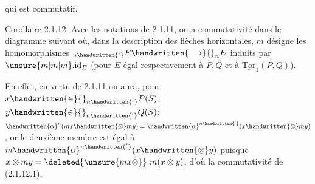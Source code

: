 \margin{\handwritten{$\unsure{=|--}$}}
 qui  est  commutatif.
\margin{\handwritten{$\big|$}}

\uline{Corollaire} 2.1.12. Avec les notations de 2.1.11, on a commutativité dans le diagramme suivant
\margin{\handwritten{$\Bigg|$}}
où, dans la description des flèches horizontales, $m$ désigne les homomorphismes $\mathord{}_{n\handwritten{'}}E\handwritten{\longrightarrow}{}_nE$ induits par $\unsure{m|\bar m|\dot m}.\mathrm{id}_E$ (pour $E$ égal respectivement à $P,Q$ et à $\underline{\mathrm{Tor}}_1(P,Q)$).

En effet, en vertu de \deleted{(}2.1.11 on aura, pour $x\handwritten{\in}{}_{n\handwritten{'}}P(S)$, $y\handwritten{\in}{}_{n\handwritten{'}}Q(S)$: $\handwritten{\alpha}^n(mx\handwritten{\otimes}my)=\handwritten{\alpha}^{n\handwritten{'}}(x\handwritten{\otimes}my)$ , or le deuxième membre est égal à $m\handwritten{\alpha}^{n\handwritten{'}}(x\handwritten{\otimes}y)$ puisque $x\otimes my=\deleted{\unsure{mx\otimes}}\ m(x\otimes y)$, d'où la commutativité de (2.1.12.1).

